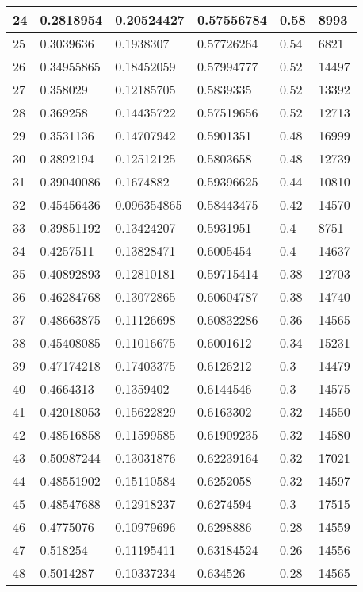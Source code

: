 \begin{longtable}{|l|l|l|l|l|l|}
24 & 0.2818954 & 0.20524427 & 0.57556784 & 0.58 & 8993 \\ \hline 
25 & 0.3039636 & 0.1938307 & 0.57726264 & 0.54 & 6821 \\ \hline 
26 & 0.34955865 & 0.18452059 & 0.57994777 & 0.52 & 14497 \\ \hline 
27 & 0.358029 & 0.12185705 & 0.5839335 & 0.52 & 13392 \\ \hline 
28 & 0.369258 & 0.14435722 & 0.57519656 & 0.52 & 12713 \\ \hline 
29 & 0.3531136 & 0.14707942 & 0.5901351 & 0.48 & 16999 \\ \hline 
30 & 0.3892194 & 0.12512125 & 0.5803658 & 0.48 & 12739 \\ \hline 
31 & 0.39040086 & 0.1674882 & 0.59396625 & 0.44 & 10810 \\ \hline 
32 & 0.45456436 & 0.096354865 & 0.58443475 & 0.42 & 14570 \\ \hline 
33 & 0.39851192 & 0.13424207 & 0.5931951 & 0.4 & 8751 \\ \hline 
34 & 0.4257511 & 0.13828471 & 0.6005454 & 0.4 & 14637 \\ \hline 
35 & 0.40892893 & 0.12810181 & 0.59715414 & 0.38 & 12703 \\ \hline 
36 & 0.46284768 & 0.13072865 & 0.60604787 & 0.38 & 14740 \\ \hline 
37 & 0.48663875 & 0.11126698 & 0.60832286 & 0.36 & 14565 \\ \hline 
38 & 0.45408085 & 0.11016675 & 0.6001612 & 0.34 & 15231 \\ \hline 
39 & 0.47174218 & 0.17403375 & 0.6126212 & 0.3 & 14479 \\ \hline 
40 & 0.4664313 & 0.1359402 & 0.6144546 & 0.3 & 14575 \\ \hline 
41 & 0.42018053 & 0.15622829 & 0.6163302 & 0.32 & 14550 \\ \hline 
42 & 0.48516858 & 0.11599585 & 0.61909235 & 0.32 & 14580 \\ \hline 
43 & 0.50987244 & 0.13031876 & 0.62239164 & 0.32 & 17021 \\ \hline 
44 & 0.48551902 & 0.15110584 & 0.6252058 & 0.32 & 14597 \\ \hline 
45 & 0.48547688 & 0.12918237 & 0.6274594 & 0.3 & 17515 \\ \hline 
46 & 0.4775076 & 0.10979696 & 0.6298886 & 0.28 & 14559 \\ \hline 
47 & 0.518254 & 0.11195411 & 0.63184524 & 0.26 & 14556 \\ \hline 
48 & 0.5014287 & 0.10337234 & 0.634526 & 0.28 & 14565 \\ \hline 

\end{longtable}
